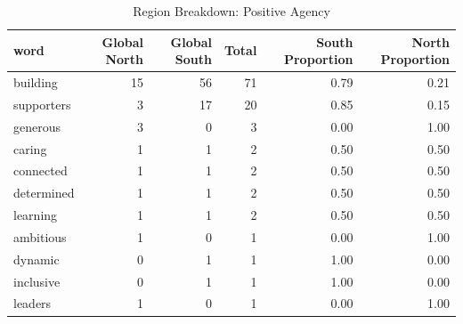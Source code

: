 \begin{table}[ht]
\centering
\begin{tabular}{lrrrrr}
  \hline
word & Global North & Global South & Total & South Proportion & North Proportion \\ 
  \hline
building &  15 &  56 &  71 & 0.79 & 0.21 \\ 
  supporters &   3 &  17 &  20 & 0.85 & 0.15 \\ 
  generous &   3 &   0 &   3 & 0.00 & 1.00 \\ 
  caring &   1 &   1 &   2 & 0.50 & 0.50 \\ 
  connected &   1 &   1 &   2 & 0.50 & 0.50 \\ 
  determined &   1 &   1 &   2 & 0.50 & 0.50 \\ 
  learning &   1 &   1 &   2 & 0.50 & 0.50 \\ 
  ambitious &   1 &   0 &   1 & 0.00 & 1.00 \\ 
  dynamic &   0 &   1 &   1 & 1.00 & 0.00 \\ 
  inclusive &   0 &   1 &   1 & 1.00 & 0.00 \\ 
  leaders &   1 &   0 &   1 & 0.00 & 1.00 \\ 
   \hline
\end{tabular}
\caption{Region Breakdown: Positive Agency} 
\end{table}
